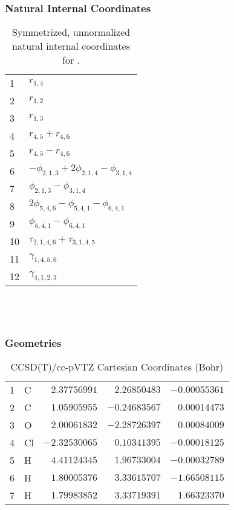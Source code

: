 \documentclass[10pt,oneside]{article}
\begin{document}
\subsubsection*{Natural Internal Coordinates}
\begin{table}[h!]
\centering
\caption{Symmetrized, unnormalized natural internal coordinates for .}
\small
\begin{tabular}{ll}
  1   & $r_{1,4}$ \\
  2   & $r_{1,2}$ \\
  3   & $r_{1,3}$ \\
  4   & $r_{4,5} + r_{4,6}$ \\
  5   & $r_{4,5} - r_{4,6}$ \\
  6   & $-\phi_{2,1,3} + 2\phi_{2,1,4} - \phi_{3,1,4}$ \\
  7   & $\phi_{2,1,3} - \phi_{3,1,4}$ \\
  8   & $2\phi_{5,4,6} - \phi_{5,4,1} - \phi_{6,4,1}$ \\
  9   & $\phi_{5,4,1} - \phi_{6,4,1}$ \\
  10  & $\tau_{2,1,4,6} + \tau_{3,1,4,5}$ \\
  11  & $\gamma_{1,4,5,6}$ \\
  12  & $\gamma_{4,1,2,3}$ \\
\end{tabular}
\end{table}

\clearpage

\subsection{\ \ \ }

\subsubsection*{Geometries}
\begin{table}[h!]
\centering
\caption{CCSD(T)/cc-pVTZ Cartesian Coordinates (Bohr)}
\begin{tabular}{llrrr}
1  & C  & $ 2.37756991$ & $ 2.26850483$ & $-0.00055361$ \\
2  & C  & $ 1.05905955$ & $-0.24683567$ & $ 0.00014473$ \\
3  & O  & $ 2.00061832$ & $-2.28726397$ & $ 0.00084009$ \\
4  & Cl & $-2.32530065$ & $ 0.10341395$ & $-0.00018125$ \\
5  & H  & $ 4.41124345$ & $ 1.96733004$ & $-0.00032789$ \\
6  & H  & $ 1.80005376$ & $ 3.33615707$ & $-1.66508115$ \\
7  & H  & $ 1.79983852$ & $ 3.33719391$ & $ 1.66323370$ \\
\end{tabular}
\end{table}
\end{document}

